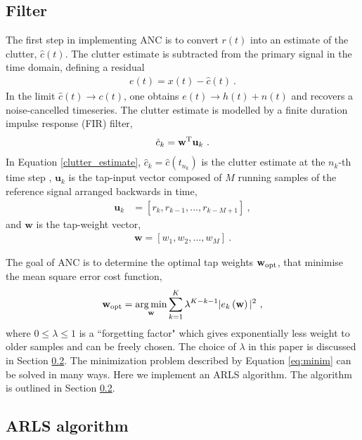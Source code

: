 \documentclass[pra,superscriptaddress,reprint,amsmath,amssymb,nofootinbib]{revtex4-2}
\DeclareMathOperator*{\argminA}{arg\,min}
\begin{document}
\subsection{Filter}

The first step in implementing ANC is to convert $r(t)$ into an estimate of the clutter, $\hat{c}(t)$. The clutter estimate is subtracted from the primary signal in the time domain, defining a residual
\begin{eqnarray}
	e(t) = x(t) - \hat{c}(t) \ .\label{eq:error_estimate}
\end{eqnarray}
In the limit $\hat{c}(t) \to c(t)$, one obtains	$e(t) \to h(t) + n(t)$ and recovers a noise-cancelled timeseries. The clutter estimate is modelled by a finite duration impulse response (FIR) filter,
\begin{eqnarray}
	\hat{c}_k = \mathbf{w}^{\rm T}\mathbf{u}_k \ . \label{clutter_estimate}
\end{eqnarray}
In Equation \eqref{clutter_estimate}, ${\hat c}_k = {\hat c}(t_{n_k})$ is the clutter estimate at the $n_k$-th time step , $\mathbf{u}_k$ is the tap-input vector composed of $M$ running samples of the reference signal arranged backwards in time,
 \begin{eqnarray}
 	\mathbf{u}_k &= [r_k, r_{k-1}, \dots, r_{k-M+1}] \ ,
 \end{eqnarray}
and $\mathbf{w}$ is the tap-weight vector,
 \begin{eqnarray}
	\mathbf{w} = [w_1, w_{2}, \dots, w_{M}] \ .
\end{eqnarray}

The goal of ANC is to determine the optimal tap weights $\mathbf{w}_{\rm opt}$, that minimise the mean square error cost function,
\begin{eqnarray}
\mathbf{w}_{\rm opt} =\argminA_{\mathbf{w}}  \sum_{k=1}^{K} \lambda^{K-k-1} |e_k \left(\mathbf{w}\right)|^2 \ , \label{eq:minim}
\end{eqnarray}
where $0 \leq \lambda \leq 1$ is a ``forgetting factor" which gives exponentially less weight to older samples and can be freely chosen. The choice of $\lambda$ in this paper is discussed in Section \ref{sec:ARLS}. The minimization problem described by Equation \eqref{eq:minim} can be solved in many ways. Here we implement an ARLS algorithm. The algorithm is outlined in Section \ref{sec:ARLS}.

\subsection{ARLS algorithm}
\label{sec:ARLS}
\end{document}
